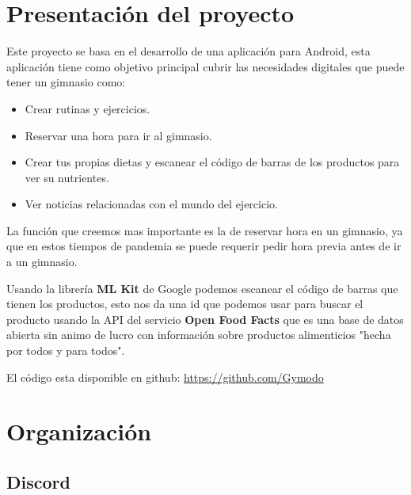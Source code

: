 \documentclass[12pt,a4paper]{article}
\begin{document}
\newpage

\tableofcontents

\newpage

\section{Presentación del proyecto}
Este proyecto se basa en el desarrollo de una aplicación para Android, esta aplicación tiene como objetivo principal cubrir las necesidades digitales que puede tener un gimnasio como:

\begin{itemize}
\item Crear rutinas y ejercicios.
\item Reservar una hora para ir al gimnasio.
\item Crear tus propias dietas y escanear el código de barras de los productos para ver su nutrientes.
\item Ver noticias relacionadas con el mundo del ejercicio.
\end{itemize}

La función que creemos mas importante es la de reservar hora en un gimnasio, ya que en estos tiempos de pandemia se puede requerir pedir hora previa antes de ir a un gimnasio.

Usando la librería \textbf{ML Kit} de Google podemos escanear el código de barras que tienen los productos, esto nos da una id que podemos usar para buscar el producto usando la API del servicio \textbf{Open Food Facts} que es una base de datos abierta sin animo de lucro con información sobre productos alimenticios "hecha por todos y para todos".


El código esta disponible en github: \href{https://github.com/Gymodo}{https://github.com/Gymodo}

\newpage

\section{Organización}

\subsection{Discord}
\end{document}
